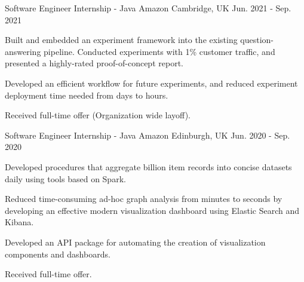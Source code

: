\begin{cventries}
  \cventry
    {Software Engineer Internship - Java} %
    {Amazon} %
    {Cambridge, UK} %
    {Jun. 2021 - Sep. 2021} %
    {
      \begin{cvitems} %
        \item {Built and embedded an experiment framework into the existing question-answering pipeline. Conducted experiments with 1\% customer traffic, and presented a highly-rated proof-of-concept report.}
        \item {Developed an efficient workflow for future experiments, and reduced experiment deployment time needed from days to hours.}
        \item {Received full-time offer (Organization wide layoff).}
      \end{cvitems}
    }

  \cventry
    {Software Engineer Internship - Java} %
    {Amazon} %
    {Edinburgh, UK} %
    {Jun. 2020 - Sep. 2020} %
    {
      \begin{cvitems} %
        \item {Developed procedures that aggregate  billion item records into concise datasets daily using tools based on Spark.}
        \item {Reduced time-consuming ad-hoc graph analysis from minutes to seconds by developing an effective modern visualization dashboard using Elastic Search and Kibana.}
        \item {Developed an API package for automating the creation of visualization components and dashboards.}
        \item {Received full-time offer.}
      \end{cvitems}
    }


\end{cventries}
